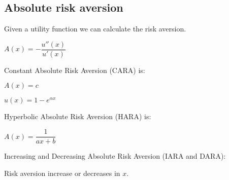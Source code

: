 
\subsection{Absolute risk aversion}

Given a utility function we can calculate the risk aversion.

\(A(x)=-\dfrac{u''(x)}{u'(x)}\)

Constant Absolute Risk Aversion (CARA) is:

\(A(x)=c\)

\(u(x)=1-e^{\alpha x}\)

Hyperbolic Absolute Risk Aversion (HARA) is:

\(A(x)=\dfrac{1}{ax+b}\)

Increasing and Decreasing Absolute Risk Aversion (IARA and DARA):

Risk aversion increase or decreases in \(x\).

